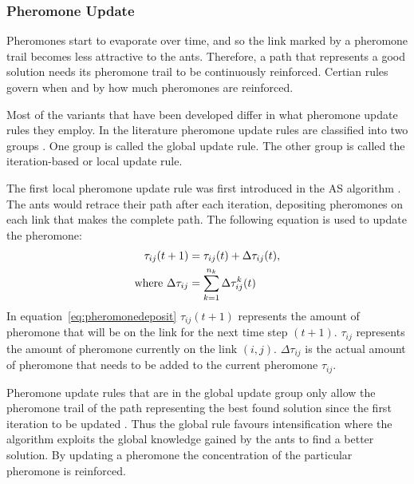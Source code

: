 \subsubsection{Pheromone Update}
Pheromones start to evaporate over time, and so the link marked by a pheromone trail becomes less attractive to the ants. Therefore, a path that represents a good solution needs its pheromone trail to be continuously reinforced. Certian rules govern when and by how much pheromones are reinforced.

 Most of the variants that have been developed differ in what pheromone update rules they employ. In the literature pheromone update rules are classified into two groups \cite{CompuIntelligenceIntro}. One group is called the global update rule. The other group is called the iteration-based or local update rule\cite{CompuIntelligenceIntro}. 

The first local pheromone update rule was first introduced in the \gls{AS} algorithm \cite{CompuIntelligenceIntro,AntSurvey,AntsAndStigmergy}. The ants would retrace their path after each iteration, depositing pheromones on each link that makes the complete path. The following equation is used to update the pheromone:
\begin{align}
\label{eq:pheromonedeposit}
 \tau_{ij}(t+1) &= \tau_{ij}(t) + \Delta\tau_{ij}(t),\\ 
 \text{where }\Delta\tau_{ij} &= \sum^{n_k}_{k=1}\Delta\tau^k_{ij}(t) \notag
\end{align}
In equation~\ref{eq:pheromonedeposit} $\tau_{ij}(t+1)$ represents the amount of pheromone that will be on the link for the next time step $(t+1)$. $\tau_{ij}$ represents the amount of pheromone currently on the link $(i,j)$. $\Delta\tau_{ij}$ is the actual amount of pheromone that needs to be added to the current pheromone $\tau_{ij}$.

Pheromone update rules that are in the global update group only allow the pheromone trail of the path representing the best found solution since the first iteration to be updated \cite{CompuIntelligenceIntro}. Thus the global rule favours intensification where the algorithm exploits the global knowledge gained by the ants to find a better solution. By updating a pheromone the concentration of the particular pheromone is reinforced.

